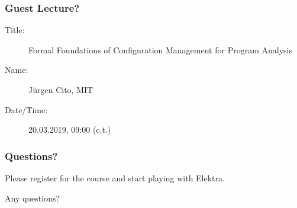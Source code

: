 \begin{frame}
	\frametitle{Guest Lecture?}

	\begin{description}
		\item[Title:] Formal Foundations of Configuration Management for Program Analysis
		\item[Name:] Jürgen Cito, MIT
		\item[Date/Time:] 20.03.2019, 09:00 (c.t.)
	\end{description}
\end{frame}

\begin{assignment}
	\frametitle{Questions?}
	\begin{task}
	Please register for the course and start playing with Elektra.
	\end{task}

	\begin{task}
	Any questions?
	\end{task}
\end{assignment}



\nocite{raab2017introducing}

\appendix

\begin{frame}[allowframebreaks]
	
	
\end{frame}




